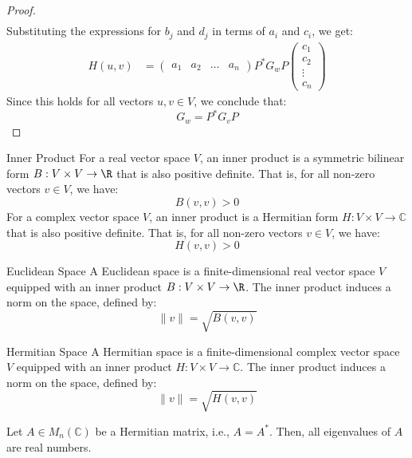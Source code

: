 \documentclass[openany]{book}
\renewcommand{\C}{\mathbb{C}}
\begin{document}
\begin{proof}
\[\begin{aligned}
\end{aligned}\]
Substituting the expressions for $b_j$ and $d_j$ in terms of $a_i$ and $c_i$, we get:
\[\begin{aligned}
H(u, v) &= \begin{pmatrix} a_1 & a_2 & \ldots & a_n \end{pmatrix} P^* G_w P \begin{pmatrix} c_1 \\ c_2 \\ \vdots \\ c_n \end{pmatrix}
\end{aligned}\]
Since this holds for all vectors $u, v \in V$, we conclude that:
$$G_w = P^* G_v P$$
\end{proof}
\begin{mydefinition}{Inner Product}
    For a real vector space $V$, an inner product is a symmetric bilinear form $B: V \times V \to \R$ that is also positive definite. That is, for all non-zero vectors $v \in V$, we have:
    $$B(v, v) > 0$$
    For a complex vector space $V$, an inner product is a Hermitian form $H: V \times V \to \C$ that is also positive definite. That is, for all non-zero vectors $v \in V$, we have:
    $$H(v, v) > 0$$
\end{mydefinition}
\begin{mydefinition}{Euclidean Space}
A Euclidean space is a finite-dimensional real vector space $V$ equipped with an inner product $B: V \times V \to \R$. The inner product induces a norm on the space, defined by:
$$\|v\| = \sqrt{B(v, v)}$$
\end{mydefinition}
\begin{mydefinition}{Hermitian Space}
A Hermitian space is a finite-dimensional complex vector space $V$ equipped with an inner product $H: V \times V \to \C$. The inner product induces a norm on the space, defined by:
$$\|v\| = \sqrt{H(v, v)}$$
\end{mydefinition}
\begin{mytheorem}
Let $A \in M_n(\C)$ be a Hermitian matrix, i.e., $A = A^*$. Then, all eigenvalues of $A$ are real numbers.
\end{mytheorem}
\end{document}
